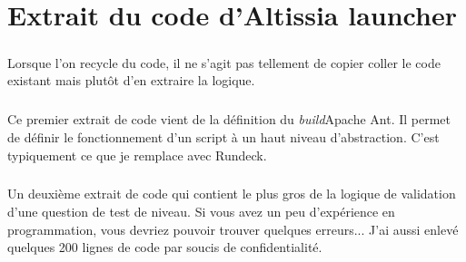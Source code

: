 \chapter{Extrait du code d'Altissia launcher}
\label{ch:altissia-launcher-code}

\paragraph{}
Lorsque l'on recycle du code, il ne s'agit pas tellement de copier coller le code existant mais plutôt d'en extraire la logique.

\paragraph{}
Ce premier extrait de code vient de la définition du \textit{build}\fnmark Apache Ant.
Il permet de définir le fonctionnement d'un script à un haut niveau d'abstraction.
C'est typiquement ce que je remplace avec Rundeck.




\paragraph{}
Un deuxième extrait de code qui contient le plus gros de la logique de validation d'une question de test de niveau.
Si vous avez un peu d'expérience en programmation, vous devriez pouvoir trouver quelques erreurs...
J'ai aussi enlevé quelques 200 lignes de code par soucis de confidentialité.


